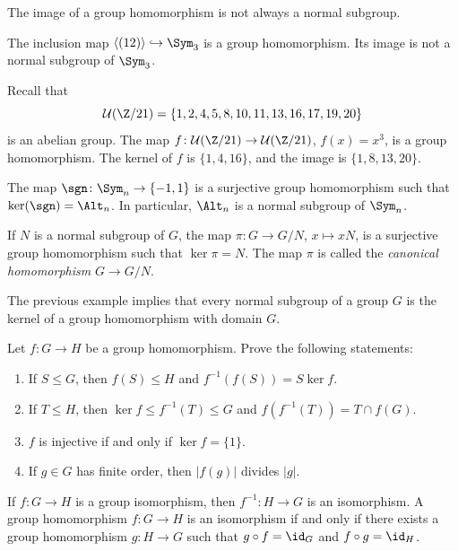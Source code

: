 The image of a group homomorphism
is not always a normal subgroup. 

\begin{example}
The inclusion map $\langle (12)\rangle\hookrightarrow\Sym_3$ is a group
homomorphism. Its image is not a normal subgroup of $\Sym_3$.
\end{example}

\begin{example}
\label{exa:U(21)}
Recall that 
\[
\mathcal{U}(\Z/21)=\{1,2,4,5,8,10,11,13,16,17,19,20\}
\]
is an abelian group. The map 
$f\colon\mathcal{U}(\Z/21)\to\mathcal{U}(\Z/21)$, $f(x)=x^3$, is a group
homomorphism. The kernel of $f$ is 
$\{1,4,16\}$, and the 
image is $\{1,8,13,20\}$. 
\end{example}

\begin{example}
The map $\sgn\colon\Sym_n\to\{-1,1\}$ is a surjective group 
homomorphism such that  
$\ker(\sgn)=\Alt_n$. In particular, $\Alt_n$ is a normal subgroup of $\Sym_n$.
\end{example}

\begin{example}
If $N$ is a normal subgroup of $G$, the map $\pi\colon G\to G/N$, $x\mapsto xN$, is a surjective group homomorphism such that 
$\ker\pi=N$. The map $\pi$ is called 
the \emph{canonical homomorphism} $G\to G/N$.
\end{example}

The previous example implies that 
every normal subgroup of a group $G$ is the kernel of a group
homomorphism with domain $G$. 


\begin{exercise}
Let $f\colon G\to H$ be a group homomorphism. 
Prove the following statements:
\begin{enumerate}
\item If $S\leq G$, then $f(S)\leq H$ and $f^{-1}(f(S))=S\ker f$.
\item If $T\leq H$, then $\ker f\leq f^{-1}(T)\leq G$ and $f(f^{-1}(T))=T\cap f(G)$.
\item $f$ is injective if and only if $\ker f=\{1\}$.
\item If $g\in G$ has finite order, then $|f(g)|$ divides $|g|$.
\end{enumerate}
\end{exercise}

If $f\colon G\to H$ is a group isomorphism, then
$f^{-1}\colon H\to G$ is an isomorphism. A group
homomorphism $f\colon G\to H$ is an isomorphism
if and only if there exists a group homomorphism 
$g\colon H\to G$ such that $g\circ f=\id_G$ and $f\circ g=\id_H$.


